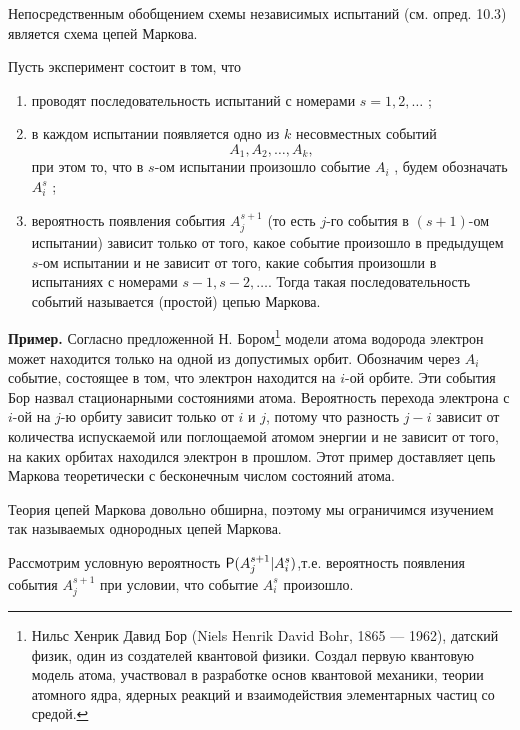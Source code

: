 
Непосредственным обобщением схемы независимых испытаний (см. опред.
10.3) является схема цепей Маркова.

\begin{definition}
Пусть эксперимент состоит в том, что
\begin{enumerate}
	\item проводят последовательность испытаний с номерами $s = 1, 2, \ldots$ ;\\
	\item в каждом испытании появляется одно из $k$ несовместных событий
	$$A_1 , A_2 , \ldots , A_k,$$ при этом то, что в $s$-ом испытании произошло событие $A_i$ , будем обозначать $A^s_i$ ;\\
	\item вероятность появления события $A^{s+1}_j$ (то есть $j$-го события в $(s+1)$-ом испытании) зависит только от того, какое событие произошло в предыдущем $s$-ом испытании и не зависит от того, какие события произошли в испытаниях с номерами $s − 1, s − 2, \ldots $.
Тогда такая последовательность событий называется (простой) цепью Маркова.
\end{enumerate}

\end{definition}

\textbf{Пример.} Согласно предложенной Н. Бором\footnote{Нильс Хенрик Давид Бор (Niels Henrik David Bohr, 1865 — 1962), датский физик, один из создателей
квантовой физики. Создал первую квантовую модель атома, участвовал в разработке основ квантовой
механики, теории атомного ядра, ядерных реакций и взаимодействия элементарных частиц со средой.
} модели атома водорода электрон может находится только на одной из допустимых орбит. Обозначим через  $A_i$ событие, состоящее в том, что электрон находится на
$i$-ой орбите. Эти события Бор назвал стационарными состояниями атома. Вероятность перехода электрона с $i$-ой на $j$-ю орбиту зависит только от $i$ и $j$, потому что разность $j − i$ зависит от количества испускаемой
или поглощаемой атомом энергии и не зависит от того, на каких орбитах находился электрон в прошлом. Этот пример доставляет цепь Маркова теоретически с бесконечным числом состояний атома.

Теория цепей Маркова довольно обширна, поэтому мы ограничимся изучением так называемых однородных цепей Маркова.

Рассмотрим условную вероятность $\P(A^{s+1}_j|A^s_i)$,т.е. вероятность появления события $A_j^{s+1}$ при условии, что событие $A^s_i$ произошло.


